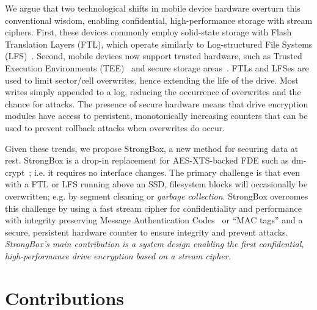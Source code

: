 We argue that two technological shifts in mobile device hardware overturn this
conventional wisdom, enabling confidential, high-performance storage with stream
ciphers. First, these devices commonly employ solid-state storage with Flash
Translation Layers (FTL), which operate similarly to Log-structured File Systems
(LFS)~\cite{LFS,F2FS,NILFS}. Second, mobile devices now support trusted
hardware, such as Trusted Execution Environments (TEE)~\cite{TEE,TrustZone} and
secure storage areas~\cite{eMMC-standard}. FTLs and LFSes are used to limit
sector/cell overwrites, hence extending the life of the drive. Most writes
simply appended to a log, reducing the occurrence of overwrites and the chance
for attacks. The presence of secure hardware means that drive encryption modules
have access to persistent, monotonically increasing counters that can be used to
prevent rollback attacks when overwrites do occur.

Given these trends, we propose StrongBox, a new method for securing data at
rest. StrongBox is a drop-in replacement for AES-XTS-backed FDE such as
dm-crypt~\cite{dmcrypt}; i.e. it requires no interface changes. The primary
challenge is that even with a FTL or LFS running above an SSD, filesystem blocks
will occasionally be overwritten; e.g. by segment cleaning or \emph{garbage
collection}. StrongBox overcomes this challenge by using a fast stream cipher
for confidentiality and performance with integrity preserving Message
Authentication Codes~\cite{MAC} or ``MAC tags'' and a secure, persistent
hardware counter to ensure integrity and prevent attacks. \emph{StrongBox's main
contribution is a system design enabling the first confidential,
high-performance drive encryption based on a stream cipher.}


\section{Contributions}

